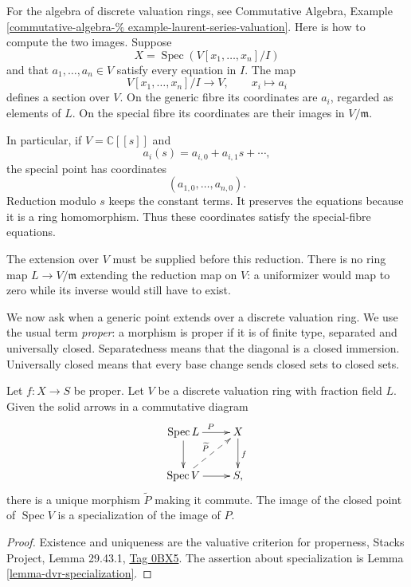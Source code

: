For the algebra of discrete valuation
rings, see Commutative Algebra, Example
\ref{commutative-algebra-%
example-laurent-series-valuation}.
Here is how to compute the two images.
Suppose
$$
X=\operatorname{Spec}
(V[x_1,\ldots,x_n]/I)
$$
and that $a_1,\ldots,a_n\in V$ satisfy
every equation in $I$.
The map
$$
V[x_1,\ldots,x_n]/I\longrightarrow V,
\qquad x_i\longmapsto a_i
$$
defines a section over $V$.
On the generic fibre its coordinates
are $a_i$, regarded as elements of $L$.
On the special fibre its coordinates
are their images in $V/\mathfrak{m}$.

In particular, if $V=\mathbb{C}[[s]]$
and
$$
a_i(s)=a_{i,0}+a_{i,1}s+\cdots,
$$
the special point has coordinates
$$
(a_{1,0},\ldots,a_{n,0}).
$$
Reduction modulo $s$ keeps the constant
terms. It preserves the equations
because it is a ring homomorphism.
Thus these coordinates satisfy the
special-fibre equations.

The extension over $V$ must be supplied
before this reduction.
There is no ring map $L\to V/\mathfrak{m}$
extending the reduction map on $V$:
a uniformizer would map to zero while
its inverse would still have to exist.

\medskip\noindent
We now ask when a generic point extends
over a discrete valuation ring.
We use the usual term {\it proper}:
a morphism is proper if it is of finite
type, separated and universally closed.
Separatedness means that the diagonal
is a closed immersion.
Universally closed means that every
base change sends closed sets to closed
sets.

\begin{theorem}
\label{theorem-proper-dvr-extension}
Let $f:X\to S$ be proper.
Let $V$ be a discrete valuation ring
with fraction field $L$.
Given the solid arrows in a commutative
diagram
$$
\xymatrix{
\operatorname{Spec}L \ar[r]^P \ar[d]
& X \ar[d]^f\\
\operatorname{Spec}V \ar[r]
\ar@{-->}[ru]^{\widetilde{P}}
& S,
}
$$
there is a unique morphism
$\widetilde{P}$ making it commute.
The image of the closed point of
$\operatorname{Spec}V$ is a specialization
of the image of $P$.
\end{theorem}

\begin{proof}
Existence and uniqueness are the
valuative criterion for properness,
Stacks Project, Lemma 29.43.1,
\href{https://stacks.math.columbia.edu/tag/%
0BX5}{Tag 0BX5}.
The assertion about specialization is
Lemma \ref{lemma-dvr-specialization}.
\end{proof}

